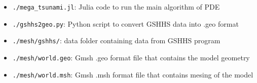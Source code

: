 \documentclass[a4paper]{article}
\begin{document}
\begin{itemize}
    \item \verb|./mega_tsunami.jl|:  Julia code to run the main algorithm of PDE
    \item \verb|./gshhs2geo.py|: Python script to convert GSHHS data into .geo format
    \item \verb|./mesh/gshhs/|: data folder containing data from GSHHS program
    \item \verb|./mesh/world.geo|: Gmsh .geo format file that contains the model geometry
    \item \verb|./mesh/world.msh|: Gmsh .msh format file that contains mesing of the model
\end{itemize}
\end{document}
